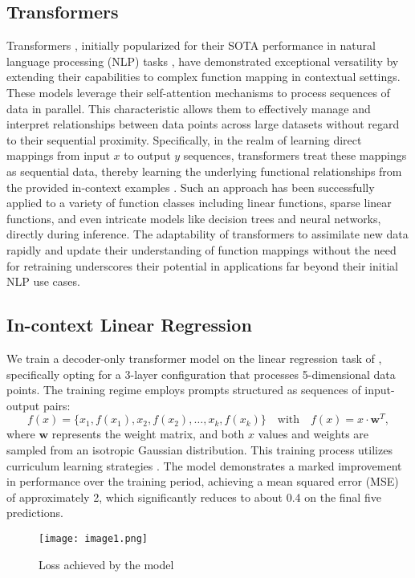 \documentclass{article}
\begin{document}
\subsection{Transformers}
Transformers \citep{vaswani_2017_attention}, initially popularized for their SOTA performance in natural language processing (NLP) tasks \citep{brown_2020_language}, have demonstrated exceptional versatility by extending their capabilities to complex function mapping in contextual settings. These models leverage their self-attention mechanisms to process sequences of data in parallel. This characteristic allows them to effectively manage and interpret relationships between data points across large datasets without regard to their sequential proximity. Specifically, in the realm of learning direct mappings from input \(x\) to output \(y\) sequences, transformers treat these mappings as sequential data, thereby learning the underlying functional relationships from the provided in-context examples \citep{garg_2023_what}. Such an approach has been successfully applied to a variety of function classes including linear functions, sparse linear functions, and even intricate models like decision trees and neural networks, directly during inference. The adaptability of transformers to assimilate new data rapidly and update their understanding of function mappings without the need for retraining underscores their potential in applications far beyond their initial NLP use cases.
\subsection{In-context Linear Regression}
We train a decoder-only transformer model on the linear regression task of \citep{garg_2023_what}, specifically opting for a 3-layer configuration that processes 5-dimensional data points. The training regime employs prompts structured as sequences of input-output pairs: 
\[
f(x) = \{x_1, f(x_1), x_2, f(x_2), \dots, x_k, f(x_k)\} \quad \mbox{with} \quad f(x) = x \cdot \mathbf{w}^T,
\]
where \( \mathbf{w} \) represents the weight matrix, and both \( x \) values and weights are sampled from an isotropic Gaussian distribution. This training process utilizes curriculum learning strategies \citep{bengio_2009_curriculum}. The model demonstrates a marked improvement in performance over the training period, achieving a mean squared error (MSE) of approximately 2, which significantly reduces to about 0.4 on the final five predictions.
\newpage
\begin{figure}[htbp]
\centering
\texttt{[image: image1.png]}
\caption{Loss achieved by the model}
\end{figure}
\end{document}
